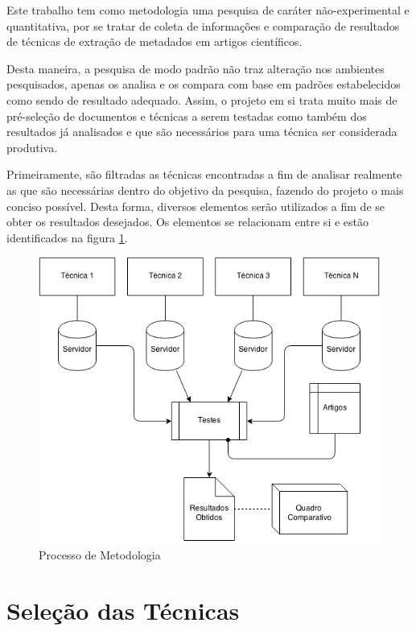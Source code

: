 \documentclass[
	12pt,               %
	openright,          %
	twoside,            %
	a4paper,            %
	english,            %
	brazil              %
	]{abntex2}
\begin{document}
Este trabalho tem como metodologia uma pesquisa de caráter não-experimental e quantitativa, por se tratar de coleta de informações e comparação de resultados de técnicas de extração de metadados em artigos científicos.

Desta maneira, a pesquisa de modo padrão não traz alteração nos ambientes pesquisados, apenas os analisa e os compara com base em padrões estabelecidos como sendo de resultado adequado. Assim, o projeto em si trata muito mais de pré-seleção de documentos e técnicas a serem testadas como também dos resultados já analisados e que são necessários para uma técnica ser considerada produtiva.


Primeiramente, são filtradas as técnicas encontradas a fim de analisar realmente as que são necessárias dentro do objetivo da pesquisa, fazendo do projeto o mais conciso possível. Desta forma, diversos elementos serão utilizados a fim de se obter os resultados desejados. Os elementos se relacionam entre si e estão identificados na figura \ref{fig:metodology}. 


\begin{figure}
\centering
\caption{Processo de Metodologia}
\label{fig:metodology}
\includegraphics[width=0.7\linewidth]{./assets/metodology}
\end{figure}


\section{Seleção das Técnicas}
\end{document}
